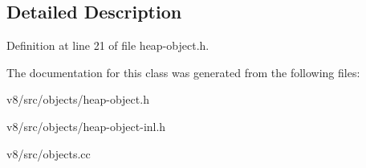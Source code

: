 \subsection{Detailed Description}


Definition at line 21 of file heap-\/object.\+h.



The documentation for this class was generated from the following files\+:\begin{DoxyCompactItemize}
\item 
v8/src/objects/heap-\/object.\+h\item 
v8/src/objects/heap-\/object-\/inl.\+h\item 
v8/src/objects.\+cc\end{DoxyCompactItemize}
